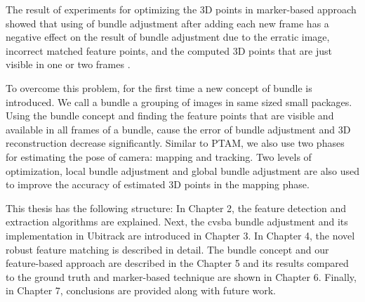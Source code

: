 The result of experiments for optimizing the 3D points in marker-based approach showed that using of bundle adjustment after adding each new frame has a negative effect on the result of bundle adjustment due to the erratic image, incorrect matched feature points, and the computed 3D points that are just visible in one or two frames \cite{barth2014marker}.

To overcome this problem, for the first time a new concept of bundle is introduced. We call a bundle a grouping of images in same sized small packages. Using the bundle concept and finding the feature points that are visible and available in all frames of a bundle, cause the error of bundle adjustment and 3D reconstruction decrease significantly. Similar to PTAM, we also use two phases for estimating the pose of camera: mapping and tracking. Two levels of optimization, local bundle adjustment and global bundle adjustment are also used to improve the accuracy of estimated 3D points in the mapping phase.

This thesis has the following structure: In Chapter 2, the feature detection and extraction algorithms are explained. Next, the cvsba bundle adjustment and its implementation in Ubitrack are introduced in Chapter 3. In Chapter 4, the novel robust feature matching is described in detail. The bundle concept and our feature-based approach are described in the Chapter 5 and its results compared to the ground truth and marker-based technique are shown in Chapter 6. Finally, in Chapter 7, conclusions are provided along with future work.

